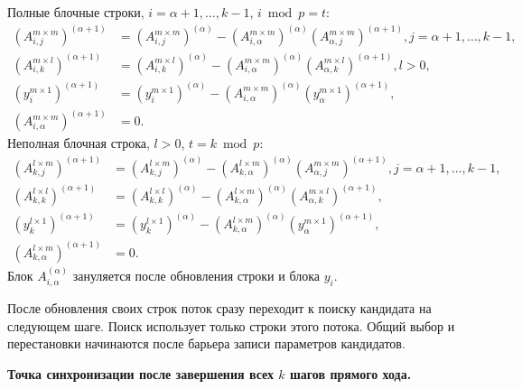\documentclass[a4paper,12pt]{article}
\newcommand{\br}[1]{\left(#1\right)}
\begin{document}
Полные блочные строки, $i = \alpha + 1, \dots, k - 1$, $i \bmod p = t$:
\begin{align*}
    \br{A_{i, j}^{m \times m}}^{(\alpha + 1)} & = \br{A_{i, j}^{m \times m}}^{(\alpha)}
        - \br{A_{i, \alpha}^{m \times m}}^{(\alpha)} \br{A_{\alpha, j}^{m \times m}}^{(\alpha + 1)},
        j = \alpha + 1, \dots, k - 1, \\
    \br{A_{i, k}^{m \times l}}^{(\alpha + 1)} & = \br{A_{i, k}^{m \times l}}^{(\alpha)}
        - \br{A_{i, \alpha}^{m \times m}}^{(\alpha)} \br{A_{\alpha, k}^{m \times l}}^{(\alpha + 1)},
        l > 0, \\
    \br{y_i^{m \times 1}}^{(\alpha + 1)} & = \br{y_i^{m \times 1}}^{(\alpha)}
        - \br{A_{i, \alpha}^{m \times m}}^{(\alpha)} \br{y_\alpha^{m \times 1}}^{(\alpha + 1)}, \\
    \br{A_{i, \alpha}^{m \times m}}^{(\alpha + 1)} & = 0.
\end{align*}
Неполная блочная строка, $l > 0$, $t = k \bmod p$:
\begin{align*}
    \br{A_{k, j}^{l \times m}}^{(\alpha + 1)} & = \br{A_{k, j}^{l \times m}}^{(\alpha)}
        - \br{A_{k, \alpha}^{l \times m}}^{(\alpha)} \br{A_{\alpha, j}^{m \times m}}^{(\alpha + 1)},
        j = \alpha + 1, \dots, k - 1, \\
    \br{A_{k, k}^{l \times l}}^{(\alpha + 1)} & = \br{A_{k, k}^{l \times l}}^{(\alpha)}
        - \br{A_{k, \alpha}^{l \times m}}^{(\alpha)} \br{A_{\alpha, k}^{m \times l}}^{(\alpha + 1)}, \\
    \br{y_k^{l \times 1}}^{(\alpha + 1)} & = \br{y_k^{l \times 1}}^{(\alpha)}
        - \br{A_{k, \alpha}^{l \times m}}^{(\alpha)} \br{y_\alpha^{m \times 1}}^{(\alpha + 1)}, \\
    \br{A_{k, \alpha}^{l \times m}}^{(\alpha + 1)} & = 0.
\end{align*}
Блок $A_{i,\alpha}^{(\alpha)}$ зануляется после обновления строки и блока $y_i$.

После обновления своих строк поток сразу переходит к поиску кандидата на следующем шаге. Поиск использует только строки этого потока. Общий выбор и перестановки начинаются после барьера записи параметров кандидатов.

\textbf{Точка синхронизации после завершения всех $k$ шагов прямого хода.}
\end{document}
